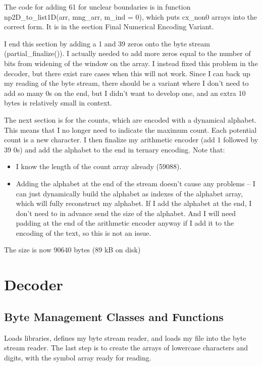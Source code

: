 \documentclass{article}
\begin{document}
The code for adding 61 for unclear boundaries is in function np2D\_to\_list1D(arr, mng\_arr, m\_ind = 0), which puts cx\_non0 arrays into the correct form. It is in the section Final Numerical Encoding Variant.

I end this section by adding a 1 and 39 zeros onto the byte stream (partial\_finalize()). I actually needed to add more zeros equal to the number of bits from widening of the window on the array. I instead fixed this problem in the decoder, but there exist rare cases when this will not work. Since I can back up my reading of the byte stream, there should be a variant where I don't need to add so many 0s on the end, but I didn't want to develop one, and an extra 10 bytes is relatively small in context.

The next section is for the counts, which are encoded with a dynamical alphabet. This means that I no longer need to indicate the maximum count. Each potential count is a new character. I then finalize my arithmetic encoder (add 1 followed by 39 0s) and add the alphabet to the end in ternary encoding. Note that:
\begin{itemize}
\item I know the length of the count array already (59088).
\item Adding the alphabet at the end of the stream doesn't cause any problems -- I can just dynamically build the alphabet as indexes of the alphabet array, which will fully reconstruct my alphabet. If I add the alphabet at the end, I don't need to in advance send the size of the alphabet. And I will need padding at the end of the arithmetic encoder anyway if I add it to the encoding of the text, so this is not an issue.
\end{itemize}

The size is now 90640 bytes (89 kB on disk)


\section{Decoder}

\subsection{Byte Management Classes and Functions} 

Loads libraries, defines my byte stream reader, and loads my file into the byte stream reader. The last step is to create the arrays of lowercase characters and digits, with the symbol array ready for reading.
\end{document}
